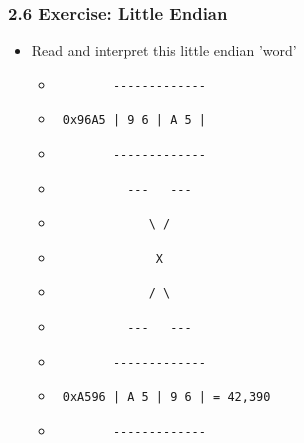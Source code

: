 \begin{frame}[fragile]
  \frametitle{2.6 Exercise: Little Endian}
    \begin{itemize}
        \item[] Read and interpret this little endian 'word'
            \begin{itemize}
                \item[] \begin{verbatim}        ------------- \end{verbatim}
                \item[] \begin{verbatim} 0x96A5 | 9 6 | A 5 | \end{verbatim}
                \item[] \begin{verbatim}        ------------- \end{verbatim}
                \item[] \begin{verbatim}          ---   ---   \end{verbatim}
                \item[] \begin{verbatim}             \ /      \end{verbatim}
                \item[] \begin{verbatim}              X       \end{verbatim}
                \item[] \begin{verbatim}             / \      \end{verbatim}
                \item[] \begin{verbatim}          ---   ---   \end{verbatim}
                \item[] \begin{verbatim}        ------------- \end{verbatim}
                \item[] \begin{verbatim} 0xA596 | A 5 | 9 6 | = 42,390 \end{verbatim}
                \item[] \begin{verbatim}        ------------- \end{verbatim}
            \end{itemize}
    \end{itemize}
\end{frame}



